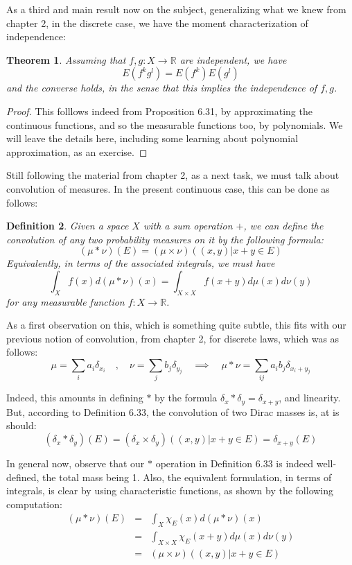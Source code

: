 \documentclass[12pt]{amsbook}
\newtheorem{theorem}{Theorem}[chapter]
\newtheorem{definition}[theorem]{Definition}
\begin{document}
As a third and main result now on the subject, generalizing what we knew from chapter 2, in the discrete case, we have the moment characterization of independence:


\begin{theorem}
Assuming that $f,g:X\to\mathbb R$ are independent, we have
$$E(f^kg^l)=E(f^k)E(g^l)$$
and the converse holds, in the sense that this implies the independence of $f,g$.
\end{theorem}

\begin{proof}
This folllows indeed from Proposition 6.31, by approximating the continuous functions, and so the measurable functions too, by polynomials. We will leave the details here, including some learning about polynomial approximation, as an exercise. 
\end{proof}

Still following the material from chapter 2, as a next task, we must talk about convolution of measures. In the present continuous case, this can be done as follows:


\begin{definition}
Given a space $X$ with a sum operation $+$, we can define the convolution of any two probability measures on it by the following formula:
$$(\mu*\nu)(E)=(\mu\times\nu)\left((x,y)\Big|x+y\in E\right)$$
Equivalently, in terms of the associated integrals, we must have 
$$\int_Xf(x)d(\mu*\nu)(x)=\int_{X\times X}f(x+y)d\mu(x)d\nu(y)$$
for any measurable function $f:X\to\mathbb R$.
\end{definition}

As a first observation on this, which is something quite subtle, this fits with our previous notion of convolution, from chapter 2, for discrete laws, which was as follows:
$$\mu=\sum_ia_i\delta_{x_i}\quad,\quad \nu=\sum_jb_j\delta_{y_j}\quad\implies\quad 
\mu*\nu=\sum_{ij}a_ib_j\delta_{x_i+y_j}$$

Indeed, this amounts in defining $*$ by the formula $\delta_x*\delta_y=\delta_{x+y}$, and linearity. But, according to Definition 6.33, the convolution of two Dirac masses is, at is should:
$$(\delta_x*\delta_y)(E)=(\delta_x\times\delta_y)\left((x,y)\Big|x+y\in E\right)=\delta_{x+y}(E)$$

In general now, observe that our $*$ operation in Definition 6.33 is indeed well-defined, the total mass being 1. Also, the equivalent formulation, in terms of integrals, is clear by using characteristic functions, as shown by the following computation:
\begin{eqnarray*}
(\mu*\nu)(E)
&=&\int_X\chi_E(x)d(\mu*\nu)(x)\\
&=&\int_{X\times X}\chi_E(x+y)d\mu(x)d\nu(y)\\
&=&(\mu\times\nu)\left((x,y)\Big|x+y\in E\right)
\end{eqnarray*}
\end{document}

